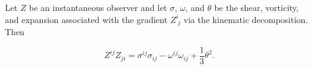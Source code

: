 Let $Z$ be an instantaneous observer and let $\sigma$, $\omega$, and $\theta$ be the shear, vorticity, and expansion associated with the gradient $Z^i_{\; j}$ via the kinematic decomposition. Then

$$Z^{ij} Z_{ji} = \sigma^{ij} \sigma_{ij} - \omega^{ij} \omega_{ij} + \frac{1}{3} \theta^2.$$
